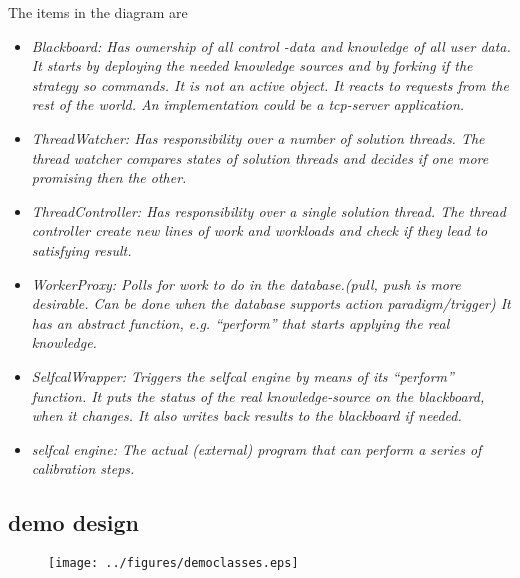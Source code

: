 \documentclass[]{lofar}
\begin{document}
      The items in the diagram are \begin{itemize}

      \item \em{Blackboard}: Has ownership of all control -data and knowledge of all
      user data. It starts by deploying the needed knowledge sources
      and by forking if the strategy so commands. It is not an active
      object. It reacts to requests from the rest of the world. An
      implementation could be a tcp-server application.

      \item \em{ThreadWatcher}: Has responsibility over a number of
      solution threads. The thread watcher compares states of solution
      threads and decides if one more promising then the other.

      \item \em{ThreadController}: Has responsibility over a single
      solution thread. The thread controller create new lines of work
      and workloads and check if they lead to satisfying result.


      \item \em{WorkerProxy}: Polls for work to do in the
      database.(pull, push is more desirable. Can be done when the
      database supports action paradigm/trigger) It has an abstract
      function, e.g. ``perform'' that starts applying the real
      knowledge.

      \item \em{SelfcalWrapper}: Triggers the selfcal engine by means
      of its ``perform'' function. It puts the status of the real
      knowledge-source on the blackboard, when it changes. It also
      writes back results to the blackboard if needed.

      \item \em{selfcal engine}: The actual (external) program that
      can perform a series of calibration steps.

      \end{itemize}

    \subsection{demo design}
    \label{subsec:demo-design}

      \begin{figure}
        \texttt{[image: ../figures/democlasses.eps]}
        \hypertarget{fig:democlasses}{}
        \caption{\label{fig:democlasses}}
      \end{figure}
\end{document}
